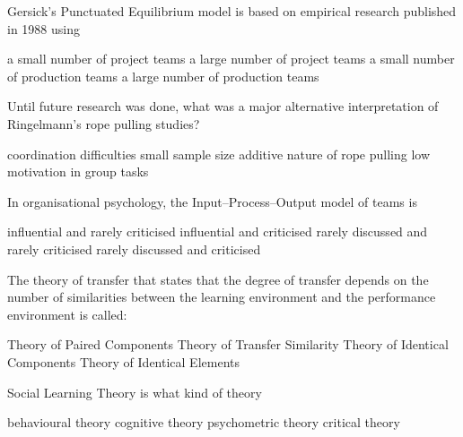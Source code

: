 \documentclass[12pt, a4paper]{exam}\usepackage[]{graphicx}\usepackage[]{color}
\begin{document}
\begin{questions}
\filbreak
\question
 Gersick's Punctuated Equilibrium model is based on empirical research published in 1988 using
\begin{choices}
\choice a small number of project teams
\choice a large number of project teams
\choice a small number of production teams
\choice a large number of production teams
\vspace{10 mm}
\end{choices}


\filbreak
\question
 Until future research was done, what was a major alternative interpretation of Ringelmann's rope pulling studies?
\begin{choices}
\choice coordination difficulties
\choice small sample size
\choice additive nature of rope pulling
\choice low motivation in group tasks
\vspace{10 mm}
\end{choices}


\filbreak
\question
 In organisational psychology, the Input--Process--Output model of teams is
\begin{choices}
\choice influential and rarely criticised
\choice influential and criticised
\choice rarely discussed and rarely criticised
\choice rarely discussed and criticised
\vspace{10 mm}
\end{choices}


\filbreak
\question
 The theory of transfer that states that the degree of transfer depends on the number of similarities between the learning environment and the performance environment is called:
\begin{choices}
\choice Theory of Paired Components
\choice Theory of Transfer Similarity
\choice Theory of Identical Components
\choice Theory of Identical Elements
\vspace{10 mm}
\end{choices}


\filbreak
\question
 Social Learning Theory is what kind of theory
\begin{choices}
\choice behavioural theory
\choice cognitive theory
\choice psychometric theory
\choice critical theory
\vspace{10 mm}
\end{choices}



\newpage

\end{questions}
\end{document}
